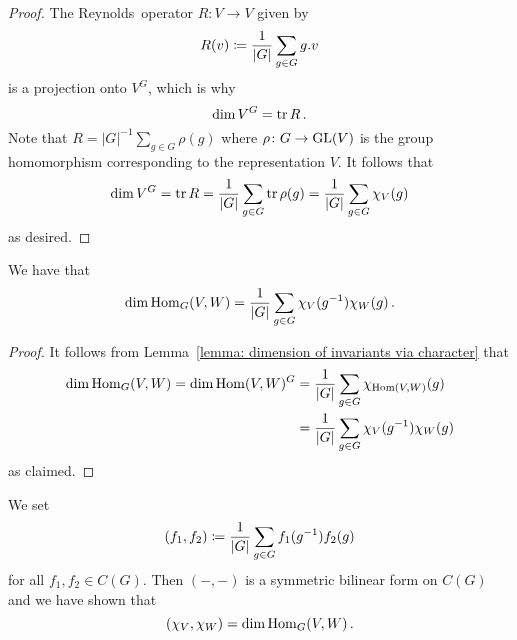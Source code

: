 \begin{proof}
  The Reynolds~operator $R \colon V \to V$ given by
  \[
              R(v)
    \coloneqq  \frac{1}{|G|} \sum_{g \in G} g.v
  \]
  is a projection onto $V^G$, which is why
  \[
      \dim V^G
    = \operatorname{tr} R \,.
  \]
  Note that $R = |G|^{-1} \sum_{g \in G} \rho(g)$ where $\rho \colon G \to \operatorname{GL}(V)$ is the group homomorphism corresponding to the representation $V$.
  It follows that
  \[
      \dim V^G
    = \operatorname{tr} R
    = \frac{1}{|G|} \sum_{g \in G} \operatorname{tr} \rho(g)
    = \frac{1}{|G|} \sum_{g \in G} \chi_V(g)
  \]
  as desired.
\end{proof}




\begin{corollary}
  \label{corollary: dim of Hom via characters}
  We have that
  \[
      \dim \operatorname{Hom}_G(V,W)
    = \frac{1}{|G|} \sum_{g \in G} \chi_V(g^{-1}) \chi_W(g) \,.
  \]
\end{corollary}


\begin{proof}
  It follows from Lemma~\ref{lemma: dimension of invariants via character} that
  \begin{align*}
        \dim \operatorname{Hom}_G(V,W)
     =  \dim \operatorname{Hom}(V,W)^G
    &=  \frac{1}{|G|} \sum_{g \in G} \chi_{\operatorname{Hom}(V,W)}(g)  \\
    &=  \frac{1}{|G|} \sum_{g \in G} \chi_V(g^{-1}) \chi_W(g)
  \end{align*}
  as claimed.
\end{proof}



\begin{fluff}
  We set
  \[
              (f_1, f_2)
    \coloneqq  \frac{1}{|G|} \sum_{g \in G} f_1(g^{-1}) f_2(g)
  \]
  for all $f_1, f_2 \in C(G)$.
  Then $(-,-)$ is a symmetric bilinear form on $C(G)$ and we have shown that
  \[
      (\chi_V, \chi_W)
    = \dim \operatorname{Hom}_G(V,W) \,.
  \]
\end{fluff}




